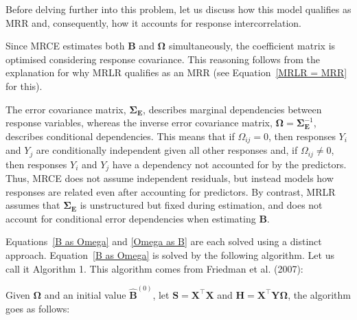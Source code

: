 \documentclass[11pt]{report} %
\begin{document}
Before delving further into this problem, let us discuss how this model qualifies as MRR and, consequently, how it accounts for response intercorrelation. 

Since MRCE estimates both \( \mathbf{B} \) and \( \mathbf{\Omega} \) simultaneously, the coefficient matrix is optimised considering response covariance. This reasoning follows from the explanation for why MRLR qualifies as an MRR (see Equation~\ref{MRLR = MRR} for this).

The error covariance matrix, \( \mathbf{\Sigma_E} \), describes marginal dependencies between response variables, whereas the inverse error covariance matrix, \( \mathbf{\Omega} = \mathbf{\Sigma}^{-1}_\mathbf{E} \), describes conditional dependencies.\cite{10.1093/biomet/asq060} This means that if \( \Omega_{ij} = 0 \), then responses \( Y_i \) and \( Y_j \) are conditionally independent given all other responses and, if \( \Omega_{ij} \neq 0 \), then responses \( Y_i \) and \( Y_j \) have a dependency not accounted for by the predictors.\cite{10.1093/biomet/asq060}
Thus, MRCE does not assume independent residuals, but instead models how responses are related even after accounting for predictors. 
By contrast, MRLR assumes that \( \mathbf{\Sigma_E} \) is unstructured but fixed during estimation, and does not account for conditional error dependencies when estimating \( \mathbf{B} \).

Equations~\ref{B as Omega} and \ref{Omega as B} are each solved using a distinct approach. Equation~\ref{B as Omega} is solved by the following algorithm. Let us call it Algorithm 1. This algorithm comes from Friedman et al. (2007):

\noindent Given \( \mathbf{\Omega} \) and an initial value \( \hat{\mathbf{B}}^{(0)} \), let \( \mathbf{S} = \mathbf{X}^\top \mathbf{X} \) and \( \mathbf{H} = \mathbf{X}^\top \mathbf{Y} \mathbf{\Omega} \), the algorithm goes as follows:
\end{document}
